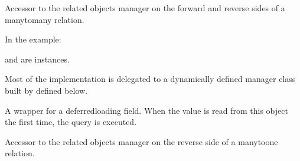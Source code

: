\documentclass[letterpaper,10pt,english,openany,oneside]{sphinxmanual}
\begin{document}
\begin{fulllineitems}

\begin{fulllineitems}
\label{\detokenize{modules/models:users.models.CustomUser.groups}}
Accessor to the related objects manager on the forward and reverse sides of
a many\sphinxhyphen{}to\sphinxhyphen{}many relation.

In the example:

\begin{sphinxVerbatim}[commandchars=\\\{\}]
 
       
\end{sphinxVerbatim}

 and  are 
instances.

Most of the implementation is delegated to a dynamically defined manager
class built by  defined below.

\end{fulllineitems}


\begin{fulllineitems}
\label{\detokenize{modules/models:users.models.CustomUser.id}}
A wrapper for a deferred\sphinxhyphen{}loading field. When the value is read from this
object the first time, the query is executed.

\end{fulllineitems}


\begin{fulllineitems}
\label{\detokenize{modules/models:users.models.CustomUser.logentry_set}}
Accessor to the related objects manager on the reverse side of a
many\sphinxhyphen{}to\sphinxhyphen{}one relation.


\end{fulllineitems}
\end{fulllineitems}
\end{document}
